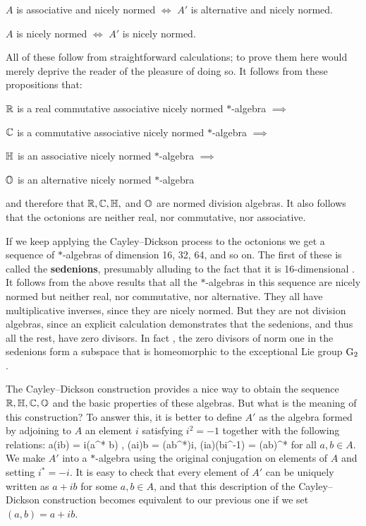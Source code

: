 \begin{prop} \et \label{CD4}   
$A$ is associative and nicely normed $\iff$   
$A'$ is alternative and nicely normed.   
\end{prop}      
   
\begin{prop} \et\label{CD5}   
$A$ is nicely normed $\iff$ $A'$ is nicely normed.    
\end{prop}      
   
\noindent All of these follow from straightforward calculations; to   
prove them here would merely deprive the reader of the pleasure of doing   
so.  It follows from these propositions that:   
\begin{center}   
${\mathbb R}$ is a real commutative associative nicely normed 
$\ast$-algebra $\implies$   
    
${\mathbb C}$ is a commutative associative nicely normed $\ast$-algebra $\implies$   
   
${\mathbb H}$ is an associative nicely normed $\ast$-algebra $\implies$   
   
${\mathbb O}$ is an alternative nicely normed $\ast$-algebra    
\end{center}   
and therefore that ${\mathbb R},{\mathbb C},{\mathbb H},$ and ${\mathbb O}$ are normed division algebras.     
It also follows that the octonions are neither real, nor commutative, nor   
associative.       
   
If we keep applying the Cayley--Dickson process to the octonions we get a   
sequence of $\ast$-algebras of dimension 16, 32, 64, and so on.   The   
first of these is called the {\bf sedenions}, presumably alluding to the   
fact that it is 16-dimensional \cite{LPS}.   It follows from the above   
results that all the $\ast$-algebras in this sequence are nicely normed   
but neither real, nor commutative, nor alternative.  They all have   
multiplicative inverses, since they are nicely normed.  But they are not   
division algebras, since an explicit calculation demonstrates that the   
sedenions, and thus all the rest, have zero divisors.   In fact    
\cite{Cohen,Moreno}, the zero divisors of norm one in the sedenions    
form a subspace that is homeomorphic to the exceptional Lie group ${\rm G}_2$.   
   
The Cayley--Dickson construction provides a nice way to obtain the
sequence ${\mathbb R},{\mathbb H},{\mathbb C},{\mathbb O}$ and the basic properties of these algebras.  But
what is the meaning of this construction?  To answer this, it is better
to define $A'$ as the algebra formed by adjoining to $A$ an element $i$
satisfying $i^2 = -1$ together with the following relations:
\be  a(ib) = i(a^* b) ,   \qquad   
    (ai)b = (ab^*)i,      \qquad   
    (ia)(bi^{-1}) = (ab)^*  \label{cd3} \ee   
for all $a,b \in A$.  We make $A'$ into a $\ast$-algebra using the   
original conjugation on elements of $A$ and setting $i^* = -i$.  It is   
easy to check that every element of $A'$ can be uniquely written as $a +   
ib$ for some $a,b \in A$, and that this description of the   
Cayley--Dickson construction becomes equivalent to our previous one    
if we set $(a,b) = a + ib$.     
   
